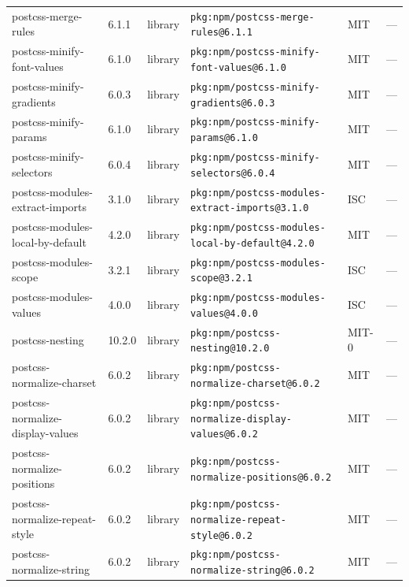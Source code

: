 \documentclass[11pt,a4paper]{article}
\begin{document}
\begin{longtable}{|p{4cm}|p{2cm}|p{1.6cm}|p{5cm}|p{1.5cm}|p{3.5cm}|}
\raggedright postcss-merge-rules & 6.1.1 & library & \small\texttt{pkg:npm/postcss-merge-rules@6.1.1} & MIT & \small — \\
\raggedright postcss-minify-font-values & 6.1.0 & library & \small\texttt{pkg:npm/postcss-minify-font-values@6.1.0} & MIT & \small — \\
\raggedright postcss-minify-gradients & 6.0.3 & library & \small\texttt{pkg:npm/postcss-minify-gradients@6.0.3} & MIT & \small — \\
\raggedright postcss-minify-params & 6.1.0 & library & \small\texttt{pkg:npm/postcss-minify-params@6.1.0} & MIT & \small — \\
\raggedright postcss-minify-selectors & 6.0.4 & library & \small\texttt{pkg:npm/postcss-minify-selectors@6.0.4} & MIT & \small — \\
\raggedright postcss-modules-extract-imports & 3.1.0 & library & \small\texttt{pkg:npm/postcss-modules-extract-imports@3.1.0} & ISC & \small — \\
\raggedright postcss-modules-local-by-default & 4.2.0 & library & \small\texttt{pkg:npm/postcss-modules-local-by-default@4.2.0} & MIT & \small — \\
\raggedright postcss-modules-scope & 3.2.1 & library & \small\texttt{pkg:npm/postcss-modules-scope@3.2.1} & ISC & \small — \\
\raggedright postcss-modules-values & 4.0.0 & library & \small\texttt{pkg:npm/postcss-modules-values@4.0.0} & ISC & \small — \\
\raggedright postcss-nesting & 10.2.0 & library & \small\texttt{pkg:npm/postcss-nesting@10.2.0} & MIT-0 & \small — \\
\raggedright postcss-normalize-charset & 6.0.2 & library & \small\texttt{pkg:npm/postcss-normalize-charset@6.0.2} & MIT & \small — \\
\raggedright postcss-normalize-display-values & 6.0.2 & library & \small\texttt{pkg:npm/postcss-normalize-display-values@6.0.2} & MIT & \small — \\
\raggedright postcss-normalize-positions & 6.0.2 & library & \small\texttt{pkg:npm/postcss-normalize-positions@6.0.2} & MIT & \small — \\
\raggedright postcss-normalize-repeat-style & 6.0.2 & library & \small\texttt{pkg:npm/postcss-normalize-repeat-style@6.0.2} & MIT & \small — \\
\raggedright postcss-normalize-string & 6.0.2 & library & \small\texttt{pkg:npm/postcss-normalize-string@6.0.2} & MIT & \small — \\

\end{longtable}
\end{document}
